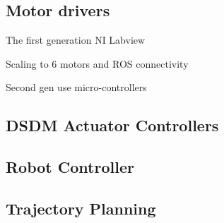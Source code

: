 \subsection{Motor drivers}

The first generation NI Labview

Scaling to 6 motors and ROS connectivity

Second gen use micro-controllers \cite{duval_flexsea-execute:_2016} 

\subsection{DSDM Actuator Controllers}



\subsection{Robot Controller}

\subsection{Trajectory Planning }

